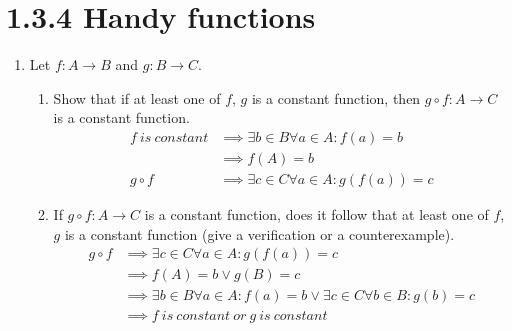 \documentclass{article}
\begin{document}
\section*{1.3.4 Handy functions}
\begin{enumerate}
    \item Let $f: A \rightarrow B$ and $g: B \rightarrow C$.
    \begin{enumerate}
        \item Show that if at least one of $f$, $g$ is a constant function, then $g \circ f : A \rightarrow C$ is a constant function.
        \begin{align*}
            f\ is\ constant &\implies \exists b \in B \forall a \in A: f(a) = b\\
            &\implies f(A) = b\\
            g \circ f &\implies \exists c \in C \forall a \in A: g(f(a)) = c
        \end{align*}
        \item If $g \circ f : A \rightarrow C$ is a constant function, does it follow that at least one of $f$,$g$ is a constant function (give a verification or a counterexample).
        \begin{align*}
            g \circ f &\implies \exists c \in C \forall a \in A: g(f(a)) = c\\
            &\implies f(A) = b \vee g(B) = c\\
            &\implies\exists b \in B \forall a \in A: f(a) = b \vee \exists c \in C \forall b \in B: g(b) = c\\
            &\implies f\ is\ constant\ or\ g\ is\ constant
        \end{align*}
    \end{enumerate}
\end{enumerate}
\end{document}
